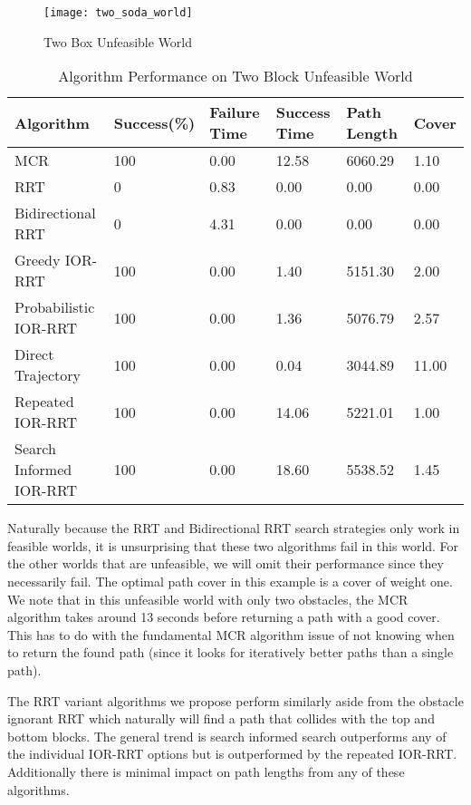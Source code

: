 \begin{figure}[h!]
    \centering
    \texttt{[image: two\_soda\_world]}
    \caption{Two Box Unfeasible World}
    \label{fig:two_soda_world}
\end{figure}

\begin{table}[h!]
\begin{tabular}{@{}llllll@{}}
\toprule
Algorithm & Success(\%)  & Failure Time  & Success Time  & Path Length & Cover\\ 
\midrule
MCR & 100 & 0.00 & 12.58 & 6060.29 & 1.10 \\
RRT & 0 & 0.83 & 0.00 & 0.00 & 0.00 \\
Bidirectional RRT & 0 & 4.31 & 0.00 & 0.00 & 0.00 \\
Greedy IOR-RRT & 100 & 0.00 & 1.40 & 5151.30 & 2.00 \\
Probabilistic IOR-RRT & 100 & 0.00 & 1.36 & 5076.79 & 2.57 \\
Direct Trajectory & 100 & 0.00 & 0.04 & 3044.89 & 11.00 \\
Repeated IOR-RRT & 100 & 0.00 & 14.06 & 5221.01 & 1.00 \\
Search Informed IOR-RRT & 100 & 0.00 & 18.60 & 5538.52 & 1.45 \\
\bottomrule
\end{tabular}
\caption{Algorithm Performance on Two Block Unfeasible World}
\label{tab:two_soda_world}
\end{table}

Naturally because the RRT and Bidirectional RRT search strategies only work in feasible worlds, it is unsurprising that these two algorithms fail in this world. For the other worlds that are unfeasible, we will omit their performance since they necessarily fail. The optimal path cover in this example is a cover of weight one.  We note that in this unfeasible world with only two obstacles, the MCR algorithm takes around 13 seconds before returning a path with a good cover. This has to do with the fundamental MCR algorithm issue of not knowing when to return the found path (since it looks for iteratively better paths than a single path). 

The RRT variant algorithms we propose perform similarly aside from the obstacle ignorant RRT which naturally will find a path that collides with the top and bottom blocks. The general trend is search informed search outperforms any of the individual IOR-RRT options but is outperformed by the repeated IOR-RRT. Additionally there is minimal impact on path lengths from any of these algorithms.




